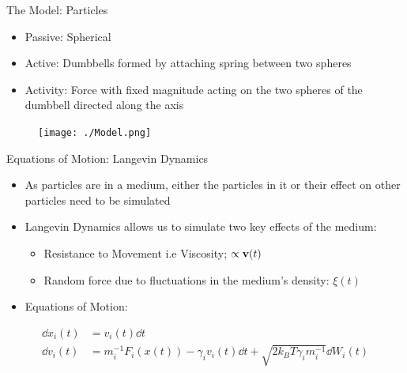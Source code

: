 \documentclass[10pt]{beamer}
\begin{document}
\begin{frame}[label={sec:org416f40e}]{The Model: Particles}
\begin{itemize}
\item Passive: Spherical
\item Active: Dumbbells formed by attaching spring between two spheres
\item Activity: Force with fixed magnitude acting on the two spheres of the dumbbell directed along the axis
\end{itemize}
\begin{figure}[htbp]
\centering
\texttt{[image: ./Model.png]}
\end{figure}
\end{frame}

\begin{frame}[label={sec:org830f769}]{Equations of Motion: Langevin Dynamics}
\begin{itemize}
\item As particles are in a medium, either the particles in it or their effect on other particles need to be simulated
\item Langevin Dynamics allows us to simulate two key effects of the medium:
\begin{itemize}
\item Resistance to Movement i.e Viscosity; \(\propto \vb{v}(t)\)
\item Random force due to fluctuations in the medium's density: \(\xi(t)\)
\end{itemize}
\item Equations of Motion:
\end{itemize}
\begin{align*}
\dd{x_i}(t) &= v_i(t)\dd{t} \\
\dd{v_i}(t) &= m_i^{-1} F_i(x(t)) - \gamma_i v_i(t) \dd{t} + \sqrt{2 k_B T \gamma_i m_i^{-1}} \dd{W_i}(t)
\end{align*}
\end{frame}
\end{document}
